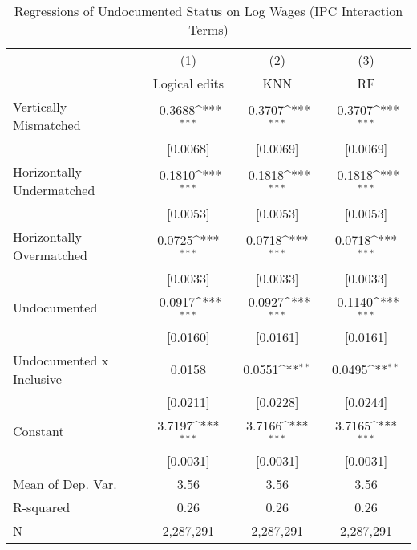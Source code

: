 \begin{table}[htbp]\centering
\def\sym#1{\ifmmode^{#1}\else\(^{#1}\)\fi}
\caption{Regressions of Undocumented Status on Log Wages (IPC Interaction Terms)}
\begin{tabular}{l*{3}{c}}
\toprule
                    &\multicolumn{1}{c}{(1)}         &\multicolumn{1}{c}{(2)}         &\multicolumn{1}{c}{(3)}         \\
                    &Logical edits         &         KNN         &          RF         \\
\midrule
Vertically Mismatched&     -0.3688\sym{***}&     -0.3707\sym{***}&     -0.3707\sym{***}\\
                    &    [0.0068]         &    [0.0069]         &    [0.0069]         \\
\addlinespace
Horizontally Undermatched&     -0.1810\sym{***}&     -0.1818\sym{***}&     -0.1818\sym{***}\\
                    &    [0.0053]         &    [0.0053]         &    [0.0053]         \\
\addlinespace
Horizontally Overmatched&      0.0725\sym{***}&      0.0718\sym{***}&      0.0718\sym{***}\\
                    &    [0.0033]         &    [0.0033]         &    [0.0033]         \\
\addlinespace
Undocumented        &     -0.0917\sym{***}&     -0.0927\sym{***}&     -0.1140\sym{***}\\
                    &    [0.0160]         &    [0.0161]         &    [0.0161]         \\
\addlinespace
Undocumented x Inclusive&      0.0158         &      0.0551\sym{**} &      0.0495\sym{**} \\
                    &    [0.0211]         &    [0.0228]         &    [0.0244]         \\
\addlinespace
Constant            &      3.7197\sym{***}&      3.7166\sym{***}&      3.7165\sym{***}\\
                    &    [0.0031]         &    [0.0031]         &    [0.0031]         \\
\midrule
Mean of Dep. Var.   &        3.56         &        3.56         &        3.56         \\
R-squared           &        0.26         &        0.26         &        0.26         \\
N                   &   2,287,291         &   2,287,291         &   2,287,291         \\
\bottomrule

\end{tabular}
\end{table}
